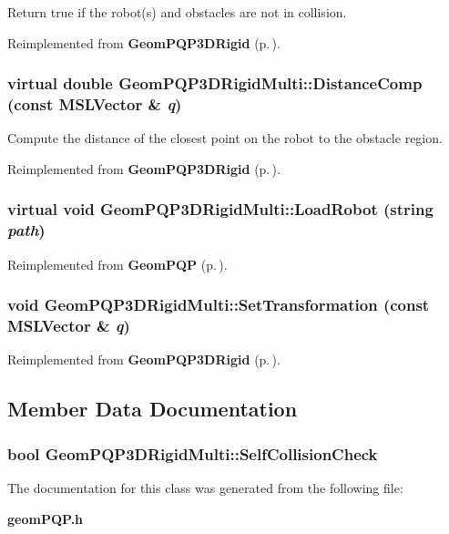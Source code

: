 Return true if the robot(s) and obstacles are not in collision.



Reimplemented from {\bf Geom\-PQP3DRigid} {\rm (p.\,\pageref{class_GeomPQP3DRigid_a2})}.
\subsubsection{\setlength{\rightskip}{0pt plus 5cm}virtual double Geom\-PQP3DRigid\-Multi::Distance\-Comp (const {\bf MSLVector} \& {\em q})\hspace{0.3cm}{\tt  [virtual]}}\label{class_GeomPQP3DRigidMulti_a3}


Compute the distance of the closest point on the robot to the obstacle region.



Reimplemented from {\bf Geom\-PQP3DRigid} {\rm (p.\,\pageref{class_GeomPQP3DRigid_a3})}.
\subsubsection{\setlength{\rightskip}{0pt plus 5cm}virtual void Geom\-PQP3DRigid\-Multi::Load\-Robot (string {\em path})\hspace{0.3cm}{\tt  [virtual]}}\label{class_GeomPQP3DRigidMulti_a4}




Reimplemented from {\bf Geom\-PQP} {\rm (p.\,\pageref{class_GeomPQP_a3})}.
\subsubsection{\setlength{\rightskip}{0pt plus 5cm}void Geom\-PQP3DRigid\-Multi::Set\-Transformation (const {\bf MSLVector} \& {\em q})}\label{class_GeomPQP3DRigidMulti_a5}




Reimplemented from {\bf Geom\-PQP3DRigid} {\rm (p.\,\pageref{class_GeomPQP3DRigid_a5})}.

\subsection{Member Data Documentation}
\subsubsection{\setlength{\rightskip}{0pt plus 5cm}bool Geom\-PQP3DRigid\-Multi::Self\-Collision\-Check}\label{class_GeomPQP3DRigidMulti_m0}




The documentation for this class was generated from the following file:\begin{CompactItemize}
\item 
{\bf geom\-PQP.h}\end{CompactItemize}
